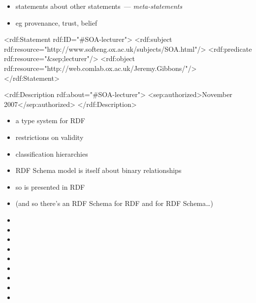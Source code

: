\documentclass{sepslide-soa-faked} %
\begin{document}
\begin{slide}
\begin{itemize}
\item statements about other statements~--- \emph{meta-statements}
\item eg provenance, trust, belief
\end{itemize}
\begin{xml}
<rdf:Statement rdf:ID="#SOA-lecturer">
  <rdf:subject 
    rdf:resource="http://www.softeng.ox.ac.uk/subjects/SOA.html"/>
  <rdf:predicate rdf:resource="&sep;lecturer"/>
  <rdf:object 
    rdf:resource="http://web.comlab.ox.ac.uk/Jeremy.Gibbons/"/>
</rdf:Statement>

<rdf:Description rdf:about="#SOA-lecturer">
  <sep:authorized>November 2007</sep:authorized>
</rdf:Description>
\end{xml}
\end{slide}

\begin{slide}
\begin{itemize}
\item a type system for RDF
\item restrictions on validity
\item classification hierarchies
\medskip
\item RDF Schema model is itself about binary relationships
\item so is presented in RDF
\item (and so there's an RDF Schema for RDF and for RDF Schema\ldots)
\end{itemize}
\end{slide}

\begin{slide}
\begin{itemize}
\item {}
\item {}
\item {}
\item {}
\item {}
\medskip
\item {}
\item {}
\item {}
\item {}
\end{itemize}
\end{slide}
\end{document}
